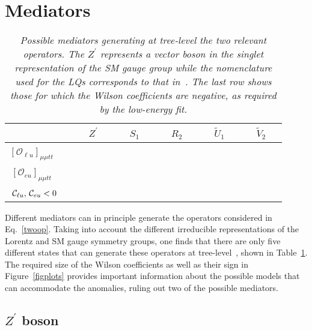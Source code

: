 \documentclass[aps,twocolumn,showpacs,preprintnumbers,amsmath,amssymb,floatfix,nofootinbib]{revtex4-1}
\newcommand{\C}{{\cal C}}
\newcommand{\cmark}{\ding{51}}%
\newcommand{\xmark}{\ding{55}}%
\begin{document}
\section{Mediators}   \label{secmodels}


\begin{table}[b]
\caption{\textit{Possible mediators generating at tree-level the two relevant operators.   The $Z^\prime$ represents a vector boson in the singlet representation of the SM gauge group while the nomenclature used for the LQs corresponds to that in~\cite{Dorsner:2016wpm}.   The last row shows those for which the Wilson coefficients are negative, as required by the low-energy fit.} \label{tab:listmed}  }
\begin{center}
\begin{tabular}{c |c c c c c |}
 \ \          &\ \ $Z^\prime$\ \ &\ \ $S_1$\ \ &\ \ $R_2$\ \ &\ \ $\widetilde{U}_1$\ \ &\ \ $\widetilde{V}_2$\ \ \\\hline   
$[\mathcal{O}_{\ell u}]_{\mu \mu tt}$\ \ \ & \color{blue}\cmark & \color{sexyred}\xmark & \color{blue}\cmark & \color{sexyred}\xmark & \color{blue}\cmark \\
$[\mathcal{O}_{eu}]_{\mu \mu tt}$\ \  \   & \color{blue}\cmark & \color{blue}\cmark & \color{sexyred}\xmark & \color{blue}\cmark & \color{sexyred}\xmark \\
$\C_{\ell u},\,\C_{eu}<0$ \  & \color{blue}\cmark & \color{sexyred}\xmark & \color{blue}\cmark & \color{blue}\cmark  & \color{sexyred}\xmark \\
\end{tabular}
\end{center}
\end{table}%


 Different mediators can in principle generate the operators considered in Eq.~\eqref{twoop}. Taking into account the different irreducible representations of the Lorentz and SM gauge symmetry groups, one finds that there are only five different states that can generate these operators at tree-level~\cite{deBlas:2017xtg}, shown in Table~\ref{tab:listmed}.  The required size of the Wilson coefficients as well as their sign in Figure~\ref{figplots} provides important information about the possible models that can accommodate the anomalies, ruling out two of the possible mediators.
%
\subsection{$Z^{\prime}$ boson}  \label{seczprime}
\end{document}

